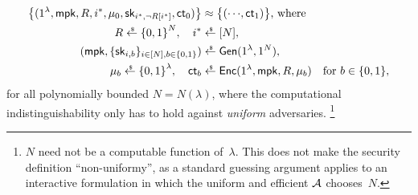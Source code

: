 \begin{definition}
\begin{align*}
\bigl\{(1^\lambda,\mpk,R,i^\ast,\mu_0,\sk_{i^\ast,\neg R[i^\ast]},\ct_0)\bigr\}
&{}\approx
\bigl\{({\cdots},\ct_1)\bigr\}
\textup{, where}\\
R\draws\bit^N,\quad
i^\ast&{}\draws[N],\\
(\mpk,\{\sk_{i,b}\}_{i\in[N],b\in\bit})
&{}\draws\Gen(1^\lambda,1^N),\\
\mu_b\draws\bit^\lambda,\quad
\ct_b&{}\draws\Enc(1^\lambda,\mpk,R,\mu_b)
\quad\textup{for }b\in\bit,
\end{align*}
for all polynomially bounded ${N=N(\lambda)}$,
where the computational indistinguishability only has to hold against \emph{uniform} adversaries.%
\footnote{$N$ need not be a computable function of~$\lambda$.
This does not make the security definition ``non-uniformy'',
as a standard guessing argument applies to an interactive formulation
in which the uniform and efficient ${\mathcal{A}}$ chooses~$N$.}
\end{definition}
